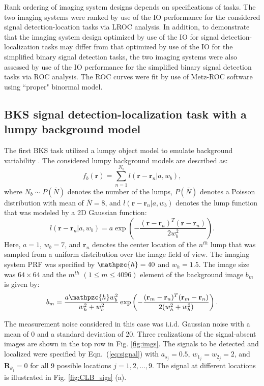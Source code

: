 \documentclass[journal]{IEEEtran}
\renewcommand{\vec}[1]{\mathbf{#1}}
\begin{document}
{Rank ordering of imaging system designs depends on specifications of tasks\cite{myers1990aperture}.}
The two imaging systems were ranked by use of the IO performance for the considered signal detection-location tasks via LROC analysis.
In addition, 
to demonstrate that the imaging system design
optimized by use of the IO for signal detection-localization tasks may differ from
that optimized by use of the IO for the simplified binary signal detection tasks,
the two imaging systems were also assessed by use of the IO performance
for the simplified binary signal detection tasks via ROC analysis.
The ROC curves were fit by use of Metz-ROC software\cite{metz1998rockit} using ``proper" binormal model\cite{metz1999proper}.

\vspace{0.8cm}
\subsection{BKS signal detection-localization task with a lumpy background model}
The first  BKS task utilized a lumpy object model to emulate background variability \cite{kupinski2005small}. 
The considered lumpy background models are described as\cite{barrett2013foundations,kupinski2005small}:
\begin{equation}
f_b(\vec{r}) = \sum_{n=1}^{N_b}l(\vec{r}-\vec{r}_n|a, w_b),
\end{equation} 
where $N_b\sim P(\bar{N})$ denotes the number of the lumps, $P(\bar{N})$ denotes a Poisson distribution with mean of $\bar{N} = 8$, and $l(\vec{r}-\vec{r}_n|a, w_b)$
denotes the lump function that was modeled by a 2D Gaussian function:
\begin{equation}
l(\vec{r}-\vec{r}_n|a, w_b) = {a}\exp\left(-\frac{(\vec{r}-\vec{r}_n)^T(\vec{r}-\vec{r}_n)}{2w_b^2}  \right).
\end{equation}
Here, $a = 1$, $w_b = 7$, and $\vec{r}_n$ denotes the center location of the $n^{th}$ lump that was sampled from a uniform distribution over the image field of view.
The imaging system  PRF was specified  by $\mathpzc{h} = 40$ and  $w_h = 1.5$. 
The image size was $64\times 64$ and 
 the $m^{th}$ $(1\leq m \leq 4096)$ element of the background image ${b}_m$ is given by:
\begin{equation}
b_{m} = \frac{a\mathpzc{h}w_b^2}{w_h^2+w_b^2}\exp\left(-\frac{(\vec{r}_m-\vec{r}_n)^T(\vec{r}_m-\vec{r}_n)}{2(w_h^2+w_b^2)}  \right).
\end{equation}

The measurement noise considered in this case was i.i.d. Gaussian noise with a mean of 0 and a standard deviation of 20. 
Three realizations of the signal-absent images are shown in the top row in Fig. \ref{fig:imgs}.
The signals to be detected and localized were specified by Eqn.\ (\ref{eq:signal})
 with $a_{s_j}=0.5$, $w_{1_j} = w_{2_j} = 2$, and $\vec{R}_{\theta_j} = 0$ for all 9 possible locations $j=1,2,...,9$.  The signal at different locations is illustrated in Fig. \ref{fig:CLB_sigs} (a).
\end{document}
